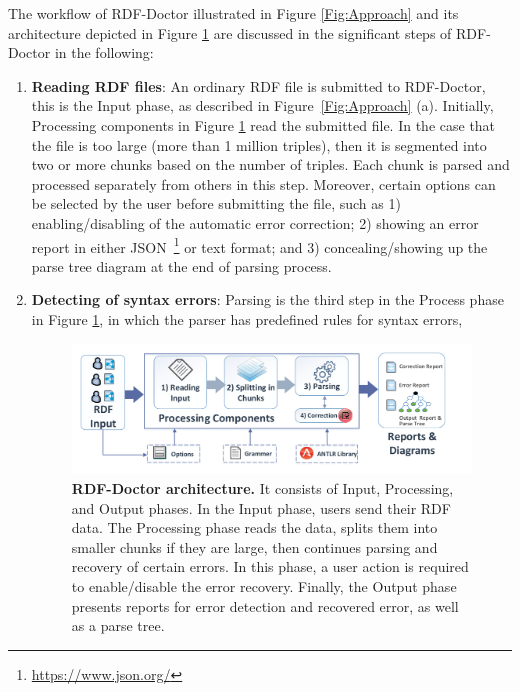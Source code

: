 The workflow of RDF-Doctor illustrated in Figure \ref{Fig:Approach} and its architecture depicted in Figure \ref{Fig:Architecture} are discussed in the significant steps of RDF-Doctor in the following:

 \begin{enumerate}[label=(\alph*)]
\item \textbf{Reading RDF files}: An ordinary RDF file is submitted to RDF-Doctor, this is the Input phase, as described in Figure~\ref{Fig:Approach} (a).
Initially, Processing components in Figure \ref{Fig:Architecture} read the submitted file. In the case that the file is too large (more than 1 million triples), then it is segmented into two or more chunks based on the number of triples. 
Each chunk is parsed and processed separately from others in this step.
Moreover, certain options can be selected by the user before submitting the file, such as 1) enabling/disabling of the automatic error correction; 2) showing an error report in either  JSON~\footnote{\url{https://www.json.org/}} or text format; and 3) concealing/showing up the parse tree diagram at the end of parsing process.
\item \textbf{Detecting of syntax errors}: Parsing is the third step in  the Process phase in Figure \ref{Fig:Architecture}, in which the parser has predefined rules for syntax errors,  %
\begin{figure}[ht]
	\begin{center}
		\includegraphics[scale=0.5]{images/architecture.pdf}
	\caption{\textbf{RDF-Doctor architecture.} It consists of Input, Processing, and Output phases. 
		In the Input phase, users send their RDF data. The Processing phase reads the data, splits them into smaller chunks if they are large, then continues parsing and recovery of certain errors.
		In this phase, a user action is required to enable/disable the error recovery.
	    Finally, the Output phase presents reports for error detection and recovered error, as well as a parse tree.}
		\label{Fig:Architecture}
	\end{center}
					      \vspace{-3mm}


\end{figure}
\end{enumerate}
